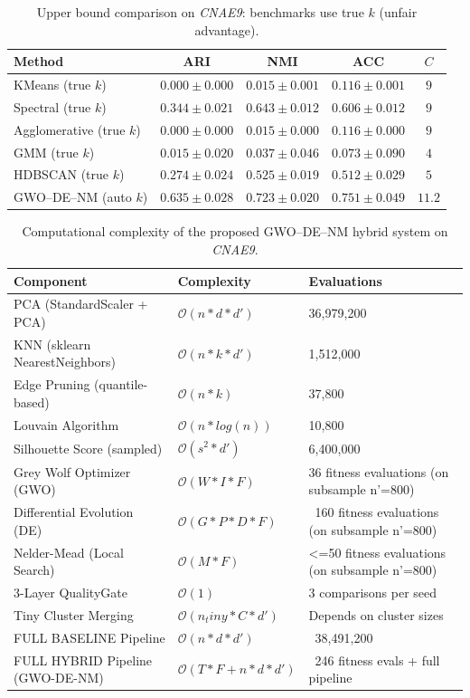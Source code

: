 \begin{table}[htbp]
\centering\small
\caption{Upper bound comparison on \textit{CNAE9}: benchmarks use true $k$ (unfair advantage).}
\label{tab:upper_cnae9}
\begin{tabular}{lcccc}
\toprule
Method & ARI & NMI & ACC & $C$ \\
\midrule
KMeans (true $k$) & $0.000 \pm 0.000$ & $0.015 \pm 0.001$ & $0.116 \pm 0.001$ & $9$ \\
Spectral (true $k$) & $0.344 \pm 0.021$ & $0.643 \pm 0.012$ & $0.606 \pm 0.012$ & $9$ \\
Agglomerative (true $k$) & $0.000 \pm 0.000$ & $0.015 \pm 0.000$ & $0.116 \pm 0.000$ & $9$ \\
GMM (true $k$) & $0.015 \pm 0.020$ & $0.037 \pm 0.046$ & $0.073 \pm 0.090$ & $4$ \\
HDBSCAN (true $k$) & $0.274 \pm 0.024$ & $0.525 \pm 0.019$ & $0.512 \pm 0.029$ & $5$ \\
\midrule
GWO--DE--NM (auto $k$) & $\mathbf{0.635 \pm 0.028}$ & $\mathbf{0.723 \pm 0.020}$ & $\mathbf{0.751 \pm 0.049}$ & $11.2$ \\
\bottomrule
\end{tabular}
\end{table}

\begin{table}[htbp]
\centering
\small
\caption{Computational complexity of the proposed GWO--DE--NM hybrid system on \textit{CNAE9}.}
\label{tab:complexity_cnae9}
\begin{tabular}{lll}
\toprule
Component & Complexity & Evaluations \\
\midrule
PCA (StandardScaler + PCA) & $\mathcal{O}(n * d * d')$ & 36,979,200 \\
KNN (sklearn NearestNeighbors) & $\mathcal{O}(n * k * d')$ & 1,512,000 \\
Edge Pruning (quantile-based) & $\mathcal{O}(n * k)$ & 37,800 \\
Louvain Algorithm & $\mathcal{O}(n * log(n))$ & 10,800 \\
Silhouette Score (sampled) & $\mathcal{O}(s^2 * d')$ & 6,400,000 \\
Grey Wolf Optimizer (GWO) & $\mathcal{O}(W * I * F)$ & 36 fitness evaluations (on subsample n'=800) \\
Differential Evolution (DE) & $\mathcal{O}(G * P * D * F)$ & ~160 fitness evaluations (on subsample n'=800) \\
Nelder-Mead (Local Search) & $\mathcal{O}(M * F)$ & <=50 fitness evaluations (on subsample n'=800) \\
3-Layer QualityGate & $\mathcal{O}(1)$ & 3 comparisons per seed \\
Tiny Cluster Merging & $\mathcal{O}(n_tiny * C * d')$ & Depends on cluster sizes \\
\midrule
FULL BASELINE Pipeline & $\mathcal{O}(n * d * d')$ & ~38,491,200 \\
\midrule
FULL HYBRID Pipeline (GWO-DE-NM) & $\mathcal{O}(T * F + n * d * d')$ & ~246 fitness evals + full pipeline \\
\bottomrule
\end{tabular}
\end{table}